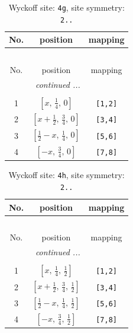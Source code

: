 \documentclass[fleqn,8pt]{jsarticle}
\begin{document}
\renewcommand{\arraystretch}{1.2}
\begin{longtable}{ccc}
\caption{Wyckoff site: {\tt 4g}, site symmetry: {\tt 2..}}
 \\
 \hline \hline
No. & position & mapping \\ \hline \endfirsthead

\multicolumn{2}{l}{\tablename\ \thetable{}} \\
 \hline \hline
No. & position & mapping \\ \hline \endhead

 \hline \hline
\multicolumn{2}{r}{\footnotesize\it continued ...} \\ \endfoot

 \hline \hline
\multicolumn{2}{r}{} \\ \endlastfoot

1 & $\left[ x,\, \frac{1}{4},\, 0 \right]$ & {\tt [1,2]} \\ \hline
2 & $\left[ x + \frac{1}{2},\, \frac{3}{4},\, 0 \right]$ & {\tt [3,4]} \\ \hline
3 & $\left[ \frac{1}{2} - x,\, \frac{1}{4},\, 0 \right]$ & {\tt [5,6]} \\ \hline
4 & $\left[ - x,\, \frac{3}{4},\, 0 \right]$ & {\tt [7,8]} \\
\end{longtable}
\renewcommand{\arraystretch}{1.2}
\begin{longtable}{ccc}
\caption{Wyckoff site: {\tt 4h}, site symmetry: {\tt 2..}}
 \\
 \hline \hline
No. & position & mapping \\ \hline \endfirsthead

\multicolumn{2}{l}{\tablename\ \thetable{}} \\
 \hline \hline
No. & position & mapping \\ \hline \endhead

 \hline \hline
\multicolumn{2}{r}{\footnotesize\it continued ...} \\ \endfoot

 \hline \hline
\multicolumn{2}{r}{} \\ \endlastfoot

1 & $\left[ x,\, \frac{1}{4},\, \frac{1}{2} \right]$ & {\tt [1,2]} \\ \hline
2 & $\left[ x + \frac{1}{2},\, \frac{3}{4},\, \frac{1}{2} \right]$ & {\tt [3,4]} \\ \hline
3 & $\left[ \frac{1}{2} - x,\, \frac{1}{4},\, \frac{1}{2} \right]$ & {\tt [5,6]} \\ \hline
4 & $\left[ - x,\, \frac{3}{4},\, \frac{1}{2} \right]$ & {\tt [7,8]} \\
\end{longtable}
\end{document}
